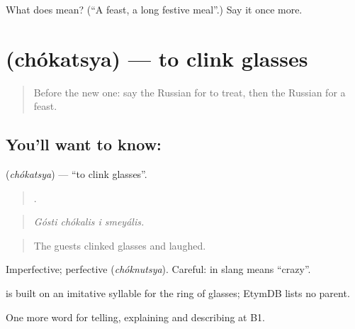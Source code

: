 \begin{tcolorbox}[breakable,colback=teal!4,colframe=teal!35!black,title={Before you move on}]
What does  mean? (\textquotedblleft{}A feast, a long festive meal\textquotedblright{}.) Say it once more.
\end{tcolorbox}
\section[\texorpdfstring{\ru{чокаться} (chókatsya)}{чокаться (chókatsya)}]{ (chókatsya) — to clink glasses}

\label{lesson:RU-C315-chokatsya}



\begin{quote}
Before the new one: say the Russian for to treat, then the Russian for a feast.
\end{quote}

\subsection*{You'll want to know: }
\textbf{} (\emph{chókatsya}) — \textquotedblleft{}to clink glasses\textquotedblright{}.

\begin{quote}
   .
\end{quote}

\begin{quote}
\emph{Gósti chókalis i smeyális.}
\end{quote}

\begin{quote}
The guests clinked glasses and laughed.
\end{quote}

Imperfective; perfective \emph{} (\emph{chóknutsya}). Careful: in slang \emph{} means \textquotedblleft{}crazy\textquotedblright{}.

\begin{cousinweb}
\emph{} is built on an imitative syllable \emph{} for the ring of glasses; EtymDB lists no parent.
\end{cousinweb}

\begin{grammarlens}[title={What you've built}]
One more word for telling, explaining and describing at B1.
\end{grammarlens}

